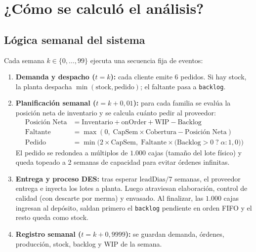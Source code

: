 \documentclass[11pt, a4paper]{article}
\begin{document}
\section{¿Cómo se calculó el análisis?}

\subsection{Lógica semanal del sistema}
Cada semana $k \in \{0, \dots, 99\}$ ejecuta una secuencia fija de eventos:
\begin{enumerate}[leftmargin=0.5cm, itemsep=2pt]
    \item \textbf{Demanda y despacho ($t = k$):} cada cliente emite 6 pedidos. Si hay stock, la planta despacha $\min(\text{stock}, \text{pedido})$; el faltante pasa a \texttt{backlog}.
    \item \textbf{Planificación semanal ($t = k + 0,01$):} para cada familia se evalúa la posición neta de inventario y se calcula cuánto pedir al proveedor:
    \begin{align}
        \text{Posición Neta} &= \text{Inventario} + \text{onOrder} + \text{WIP} - \text{Backlog} \\
        \text{Faltante} &= \max(0,\; \text{CapSem} \times \text{Cobertura} - \text{Posición Neta}) \\
        \text{Pedido} &= \min\!\Big(2 \times \text{CapSem},\; \text{Faltante} \times \big(\text{Backlog} > 0 \;\text{?}\; \alpha : 1,0\big)\Big)
    \end{align}
    El pedido se redondea a múltiplos de $1.000$ cajas (tamaño del lote físico) y queda topeado a 2 semanas de capacidad para evitar órdenes infinitas.
    \item \textbf{Entrega y proceso DES:} tras esperar $\text{leadDias}/7$ semanas, el proveedor entrega e inyecta los lotes a planta. Luego atraviesan elaboración, control de calidad (con descarte por merma) y envasado. Al finalizar, las $1.000$ cajas ingresan al depósito, saldan primero el \texttt{backlog} pendiente en orden FIFO y el resto queda como stock.
    \item \textbf{Registro semanal ($t = k + 0,9999$):} se guardan demanda, órdenes, producción, stock, backlog y WIP de la semana.
\end{enumerate}
\end{document}
